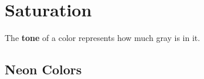 \section{Saturation} 

  \begin{definition}[Tone]
    The \textbf{tone} of a color represents how much gray is in it. 
  \end{definition}

\subsection{Neon Colors}
